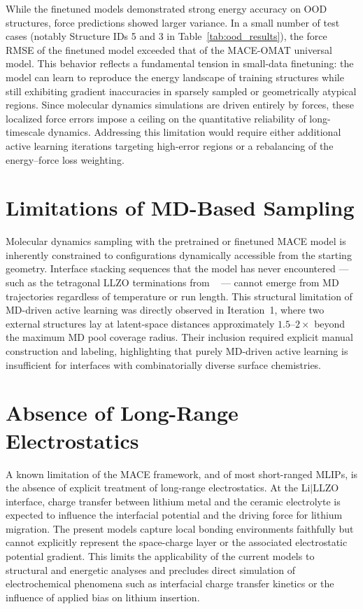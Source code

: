 \documentclass[12pt,a4paper,oneside]{book}
\begin{document}
While the finetuned models demonstrated strong energy accuracy on OOD structures,
force predictions showed larger variance. In a small number of test cases (notably
Structure IDs 5 and 3 in Table~\ref{tab:ood_results}), the force RMSE of the finetuned
model exceeded that of the MACE-OMAT universal model. This behavior reflects a
fundamental tension in small-data finetuning: the model can learn to reproduce the
energy landscape of training structures while still exhibiting gradient inaccuracies
in sparsely sampled or geometrically atypical regions. Since molecular dynamics
simulations are driven entirely by forces, these localized force errors impose a ceiling
on the quantitative reliability of long-timescale dynamics. Addressing this limitation
would require either additional active learning iterations targeting high-error regions
or a rebalancing of the energy--force loss weighting.

\section{Limitations of MD-Based Sampling}

Molecular dynamics sampling with the pretrained or finetuned MACE model is inherently
constrained to configurations dynamically accessible from the starting geometry.
Interface stacking sequences that the model has never encountered --- such as the
tetragonal LLZO terminations from \citeauthor{Burov2024LiLLZOChargeTransfer}~\cite{Burov2024LiLLZOChargeTransfer} --- cannot
emerge from MD trajectories regardless of temperature or run length. This structural
limitation of MD-driven active learning was directly observed in Iteration~1, where two
external structures lay at latent-space distances approximately $1.5$--$2\times$ beyond
the maximum MD pool coverage radius. Their inclusion required explicit manual
construction and labeling, highlighting that purely MD-driven active learning is
insufficient for interfaces with combinatorially diverse surface chemistries.

\section{Absence of Long-Range Electrostatics}

A known limitation of the MACE framework, and of most short-ranged MLIPs, is the
absence of explicit treatment of long-range electrostatics. At the Li$|$LLZO interface,
charge transfer between lithium metal and the ceramic electrolyte is expected to
influence the interfacial potential and the driving force for lithium migration.
The present models capture local bonding environments faithfully but cannot explicitly
represent the space-charge layer or the associated electrostatic potential gradient.
This limits the applicability of the current models to structural and energetic
analyses and precludes direct simulation of electrochemical phenomena such as
interfacial charge transfer kinetics or the influence of applied bias on lithium
insertion.
\end{document}
